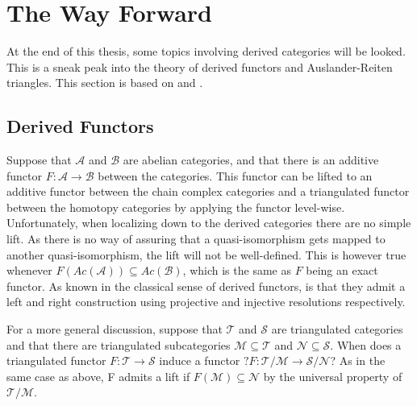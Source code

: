\section{The Way Forward}

    At the end of this thesis, some topics involving derived categories will be looked. This is a sneak peak into the theory of derived functors and Auslander-Reiten triangles. This section is based on \cite{happel} and \cite{Kel96}. 

    \subsection{Derived Functors}

        Suppose that $\mathcal{A}$ and $\mathcal{B}$ are abelian categories, and that there is an additive functor $F:\mathcal{A}\rightarrow\mathcal{B}$ between the categories. This functor can be lifted to an additive functor between the chain complex categories and a triangulated functor between the homotopy categories by applying the functor level-wise. Unfortunately, when localizing down to the derived categories there are no simple lift. As there is no way of assuring that a quasi-isomorphism gets mapped to another quasi-isomorphism, the lift will not be well-defined. This is however true whenever $F(Ac(\mathcal{A}))\subseteq Ac(\mathcal{B})$, which is the same as $F$ being an exact functor. As known in the classical sense of derived functors, is that they admit a left and right construction using projective and injective resolutions respectively.

        \begin{center}
        \end{center}

        For a more general discussion, suppose that $\mathcal{T}$ and $\mathcal{S}$ are triangulated categories and that there are triangulated subcategories $\mathcal{M}\subseteq\mathcal{T}$ and $\mathcal{N}\subseteq\mathcal{S}$. When does a triangulated functor $F:\mathcal{T}\rightarrow\mathcal{S}$ induce a functor $?F : \mathcal{T}/\mathcal{M}\rightarrow \mathcal{S}/\mathcal{N}$? As in the same case as above, F admits a lift if $F(\mathcal{M})\subseteq\mathcal{N}$ by the universal property of $\mathcal{T}/\mathcal{M}$.


